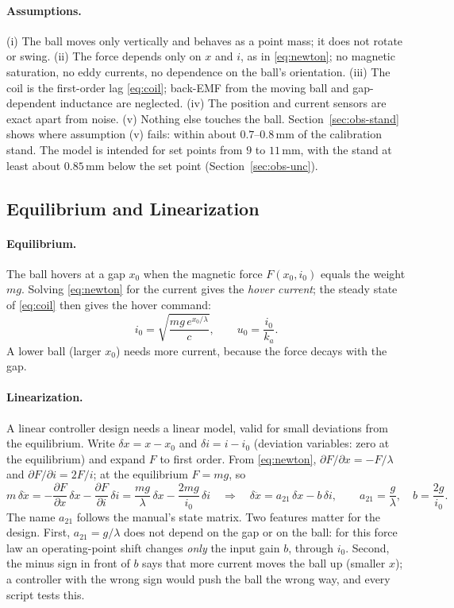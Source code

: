\documentclass[11pt,a4paper]{article}
\begin{document}
\paragraph{Assumptions.} (i) The ball moves only vertically and behaves as a point mass; it does not rotate or swing.
(ii) The force depends only on $x$ and $i$, as in \eqref{eq:newton}; no magnetic saturation, no eddy currents, no
dependence on the ball's orientation. (iii) The coil is the first-order lag \eqref{eq:coil}; back-EMF from the moving
ball and gap-dependent inductance are neglected. (iv) The position and current sensors are exact apart from noise.
(v) Nothing else touches the ball. Section~\ref{sec:obs-stand} shows where assumption (v) fails: within about
$0.7$--$0.8$\,mm of the calibration stand. The model is intended for set points from $9$ to $11$\,mm, with the stand at
least about $0.85$\,mm below the set point (Section~\ref{sec:obs-unc}).

\subsection{Equilibrium and Linearization}
\label{sec:th-lin}
\paragraph{Equilibrium.} The ball hovers at a gap $x_0$ when the magnetic force $F(x_0,i_0)$ equals the
weight $mg$.
Solving \eqref{eq:newton} for the current gives the \emph{hover current}; the steady state of \eqref{eq:coil} then
gives the hover command:
\begin{equation}
i_0 = \sqrt{\frac{m g\, e^{x_0/\lambda}}{c}}, \qquad u_0 = \frac{i_0}{k_a}.
\label{eq:hover}
\end{equation}
A lower ball (larger $x_0$) needs more current, because the force decays with the gap.

\paragraph{Linearization.} A linear controller design needs a linear model, valid for small deviations from the
equilibrium. Write $\delta x = x - x_0$ and $\delta i = i - i_0$ (deviation variables: zero at the equilibrium) and
expand $F$ to first order. From \eqref{eq:newton}, $\partial F/\partial x = -F/\lambda$ and
$\partial F/\partial i = 2F/i$; at the equilibrium $F=mg$, so
\begin{equation}
m\,\delta\ddot{x} = -\frac{\partial F}{\partial x}\,\delta x - \frac{\partial F}{\partial i}\,\delta i
= \frac{m g}{\lambda}\,\delta x - \frac{2 m g}{i_0}\,\delta i
\quad\Longrightarrow\quad
\delta\ddot{x} = a_{21}\,\delta x - b\,\delta i, \qquad a_{21}=\frac{g}{\lambda}, \quad b=\frac{2g}{i_0}.
\label{eq:lin}
\end{equation}
The name $a_{21}$ follows the manual's state matrix. Two features matter for the design. First,
$a_{21}=g/\lambda$ does not depend on the gap or on the ball: for this force law an operating-point shift changes
\emph{only} the input gain $b$, through $i_0$. Second, the minus sign in front of $b$ says that more current moves the ball
up (smaller $x$); a controller with the wrong sign would push the ball the wrong way, and every script tests this.
\end{document}

